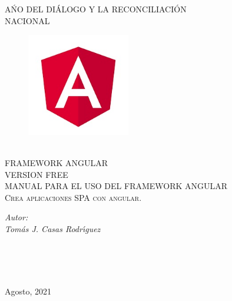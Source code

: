 \begin{titlepage}
\begin{center}
\textsc{\Large A\'NO DEL DI\'ALOGO Y LA RECONCILIACI\'ON}\\[0.5cm] 
\textsc{\Large NACIONAL}\\[0.5cm] 
\begin{figure}[h]
\centering
\includegraphics[width=0.4\textwidth]{logo.jpg}
\end{figure}

\textsc{\huge }\\[0.3cm]
\textsc{\Large FRAMEWORK ANGULAR}\\[0.2cm]
\textsc{\Large VERSION FREE}\\[1.5cm] 
\textsc{\Large MANUAL PARA EL USO DEL FRAMEWORK ANGULAR }\\[0.5cm] 
\textsc{\Large  Crea aplicaciones SPA con angular.}\\[3.0cm] 
\bigskip
\begin{minipage}{0.4\textwidth}
\begin{flushleft} \large
\bigskip
\bigskip
\emph{Autor: }\\
\emph{Tom\'as J. Casas Rodr\'\i{}guez}\\

\end{flushleft}
\end{minipage}
\begin{minipage}{0.4\textwidth}
\begin{flushright} \large
\bigskip
\bigskip
\emph{} \\
\emph{} \\

\end{flushright}
\end{minipage}\\[2cm]
{\large Agosto, 2021}\\[2cm] 
\vfill
\end{center}
\end{titlepage}